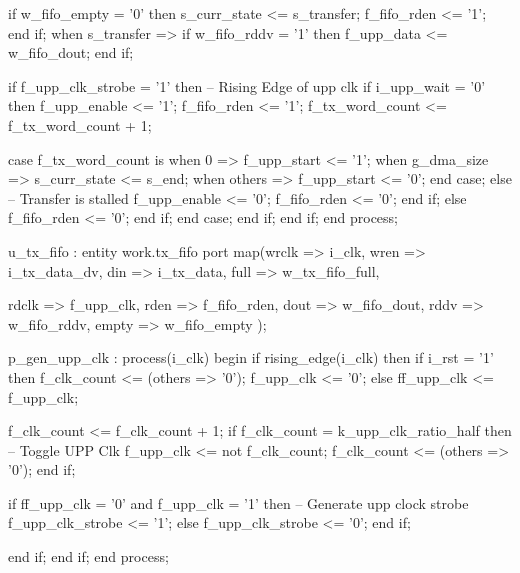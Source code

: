 \begin{VHDLlisting}[tabsize=2]
                        if w_fifo_empty = '0' then
                            s_curr_state <= s_transfer;
                            f_fifo_rden <= '1';
                        end if;					
                    when s_transfer => 
                        if w_fifo_rddv = '1' then
                            f_upp_data <= w_fifo_dout;
                        end if;
						
                        if f_upp_clk_strobe = '1' then
                            -- Rising Edge of upp clk
                            if i_upp_wait = '0' then
                                f_upp_enable <= '1';
                                f_fifo_rden <= '1';
                                f_tx_word_count <= f_tx_word_count + 1;
							
                                case f_tx_word_count is
                                    when 0 => 
                                        f_upp_start <= '1';
                                    when g_dma_size => 
                                        s_curr_state <= s_end;
                                    when others =>
                                        f_upp_start <= '0';
                                end case;			
                            else
                                -- Transfer is stalled
                                f_upp_enable <= '0';
                                f_fifo_rden <= '0';
                            end if;							
                        else
                            f_fifo_rden <= '0';
                        end if;
                end case;
            end if;
        end if;
    end process;
	
	
    u_tx_fifo : entity work.tx_fifo
    port map(wrclk => i_clk, 
             wren  => i_tx_data_dv,
             din   => i_tx_data,
             full  => w_tx_fifo_full,
	
             rdclk => f_upp_clk,
             rden  => f_fifo_rden,
             dout  => w_fifo_dout,
             rddv  => w_fifo_rddv,
             empty => w_fifo_empty	
    );
	
    p_gen_upp_clk : process(i_clk)
    begin
        if rising_edge(i_clk) then
            if i_rst = '1' then
                f_clk_count <= (others => '0');
                f_upp_clk <= '0';
            else
                ff_upp_clk <= f_upp_clk;
			
                f_clk_count <= f_clk_count + 1;
                if f_clk_count = k_upp_clk_ratio_half then
                    -- Toggle UPP Clk
                    f_upp_clk <= not f_clk_count;
                    f_clk_count <= (others => '0');
                end if;
				
                if ff_upp_clk = '0' and f_upp_clk = '1' then
                    -- Generate upp clock strobe
                    f_upp_clk_strobe <= '1';
                else
                    f_upp_clk_strobe <= '0';
                end if;
				
            end if;
        end if;	
    end process;
\end{VHDLlisting}

